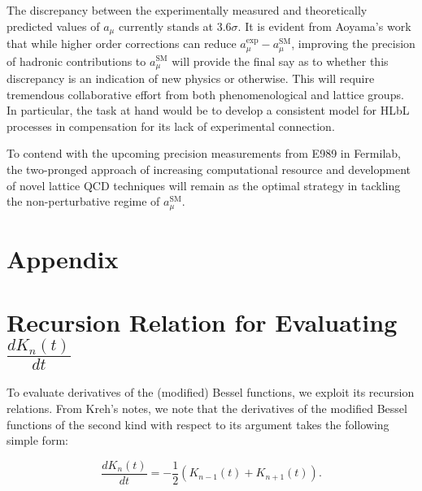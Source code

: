 \documentclass{article}
\numberwithin{equation}{section} %
\begin{document}
%

The discrepancy between the experimentally measured and theoretically predicted values of $a_\mu$ currently stands at 3.6$\sigma$\cite{lehnerg2}. It is evident from Aoyama's work\cite{aoyama} that while higher order corrections can reduce $a_\mu^\mathrm{exp} - a_\mu^\mathrm{SM}$, improving the precision of hadronic contributions to $a_\mu^\mathrm{SM}$ will provide the final say as to whether this discrepancy is an indication of new physics or otherwise. This will require tremendous collaborative effort from both phenomenological and lattice groups. In particular, the task at hand would be to develop a consistent model for HLbL processes in compensation for its lack of experimental connection\cite{lehnerg2}.

To contend with the upcoming precision measurements from E989 in Fermilab, the two-pronged approach of increasing computational resource and development of novel lattice QCD techniques will remain as the optimal strategy in tackling the non-perturbative regime of $a_\mu^\mathrm{SM}$.





\newpage


\newpage
\appendix
\section*{Appendix}

\section{Recursion Relation for Evaluating $\frac{dK_n(t)}{dt}$}\label{bessel recursion}

To evaluate derivatives of the (modified) Bessel functions, we exploit its recursion relations. From Kreh's notes\cite{bessel_recurrence}, we note that the derivatives of the modified Bessel functions of the second kind with respect to its argument takes the following simple form:

\begin{equation}
\frac{dK_n(t)}{dt} = -\frac{1}{2}(K_{n-1}(t)+K_{n+1}(t)).
\end{equation}  
\end{document}
